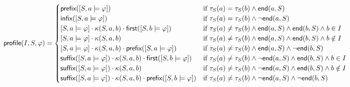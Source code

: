 \scriptsize
	\begin{equation*} 
		\mathsf{profile}(I, S, \varphi) =
		\begin{cases}
			\textsf{prefix}([S, a \models \varphi]) &\text{if $\tau_S(a) = \tau_S(b) \land \mathsf{end}(a, S)$} \\
			\textsf{infix}([S, a \models \varphi]) &\text{if $\tau_S(a) = \tau_S(b) \land \lnot\mathsf{end}(a, S)$} \\
			[S, a \models \varphi] \cdot \kappa(S, a, b) \cdot \textsf{first}([S, b \models \varphi]) &\text{if $\tau_S(a) \neq \tau_S(b) \land \mathsf{end}(a, S) \land \mathsf{end}(b, S) \land b \in I$} \\
			[S, a \models \varphi] \cdot \kappa(S, a, b) &\text{if $\tau_S(a) \neq \tau_S(b) \land \mathsf{end}(a, S) \land \mathsf{end}(b, S) \land b \notin I$} \\
			[S, a \models \varphi] \cdot \kappa(S, a, b) \cdot \textsf{prefix}([S, a \models \varphi]) &\text{if $\tau_S(a) \neq \tau_S(b) \land \mathsf{end}(a, S) \land \lnot\mathsf{end}(b, S)$} \\
			\textsf{suffix}([S, a \models \varphi]) \cdot \kappa(S, a, b) \cdot \textsf{first}([S, b \models \varphi]) &\text{if $\tau_S(a) \neq \tau_S(b) \land \lnot\mathsf{end}(a, S) \land \mathsf{end}(b, S) \land b \in I$} \\
			\textsf{suffix}([S, a \models \varphi]) \cdot \kappa(S, a, b) &\text{if $\tau_S(a) \neq \tau_S(b) \land \lnot\mathsf{end}(a, S) \land \mathsf{end}(b, S) \land b \notin I$} \\
			\textsf{suffix}([S, a \models \varphi]) \cdot \kappa(S, a, b) \cdot \textsf{prefix}([S, b \models \varphi]) &\text{if $\tau_S(a) \neq \tau_S(b) \land \lnot\mathsf{end}(a, S) \land \lnot\mathsf{end}(b, S)$} 
		\end{cases}
	\end{equation*}
\normalsize

